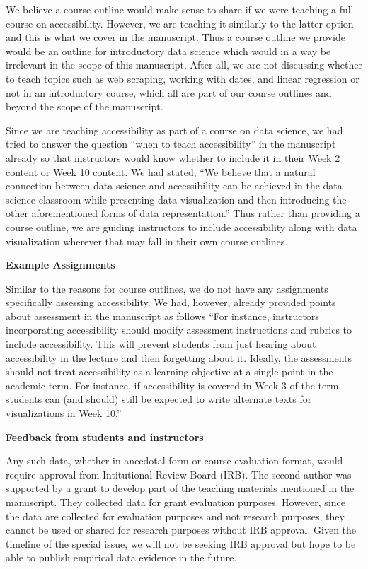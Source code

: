 \documentclass[draft]{article}
\begin{document}
We believe a course outline would make sense to share if we were teaching a full course on accessibility.
However, we are teaching it similarly to the latter option and this is what we cover in the manuscript.
Thus a course outline we provide would be an outline for introductory data science which would in a way be irrelevant in the scope of this manuscript.
After all, we are not discussing whether to teach topics such as web scraping, working with dates, and linear regression or not in an introductory course, which all are part of our course outlines and beyond the scope of the manuscript.

Since we are teaching accessibility as part of a course on data science, we had tried to answer the question ``when to teach accessibility'' in the manuscript already so that instructors would know whether to include it in their Week 2 content or Week 10 content.
We had stated, ``We believe that a natural connection between data science and accessibility can be achieved in the data science classroom while presenting data visualization and then introducing the other aforementioned forms of data representation.''
Thus rather than providing a course outline, we are guiding instructors to include accessibility along with data visualization wherever that may fall in their own course outlines.

\textbf{Example Assignments}

Similar to the reasons for course outlines, we do not have any assignments specifically assessing accessibility.
We had, however, already provided points about assessment in the manuscript as follows ``For instance,
instructors incorporating accessibility should modify assessment instructions and rubrics to include
accessibility. This will prevent students from just hearing about accessibility in the lecture
and then forgetting about it. Ideally, the assessments should not treat accessibility as a learning
objective at a single point in the academic term. For instance, if accessibility is covered in Week 3
of the term, students can (and should) still be expected to write alternate texts for visualizations
in Week 10.''

\textbf{Feedback from students and instructors}

Any such data, whether in anecdotal form or course evaluation format, would require approval from Intitutional Review Board (IRB).
The second author was supported by a grant to develop part of the teaching materials mentioned in the manuscript.
They collected data for grant evaluation purposes.
However, since the data are collected for evaluation purposes and not research purposes, they cannot be used or shared for research purposes without IRB approval.
Given the timeline of the special issue, we will not be seeking IRB approval but hope to be able to publish empirical data evidence in the future.
\end{document}
